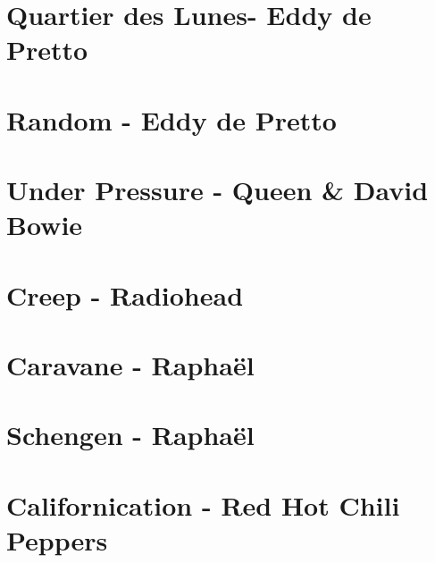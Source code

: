 \documentclass[11pt]{article}
\begin{document}
\section{Quartier des Lunes- Eddy de Pretto}
\begin{guitar}

\end{guitar}

\section{Random - Eddy de Pretto}
\begin{guitar}

\end{guitar}

\section{Under Pressure - Queen \& David Bowie}
\begin{guitar}

\end{guitar}

\section{Creep - Radiohead}
\begin{guitar}

\end{guitar}

\section{Caravane - Raphaël}
\begin{guitar}

\end{guitar}

\section{Schengen - Raphaël}
\begin{guitar}

\end{guitar}

\section*{Californication - Red Hot Chili Peppers}
\begin{guitar}

\end{guitar}
\end{document}
